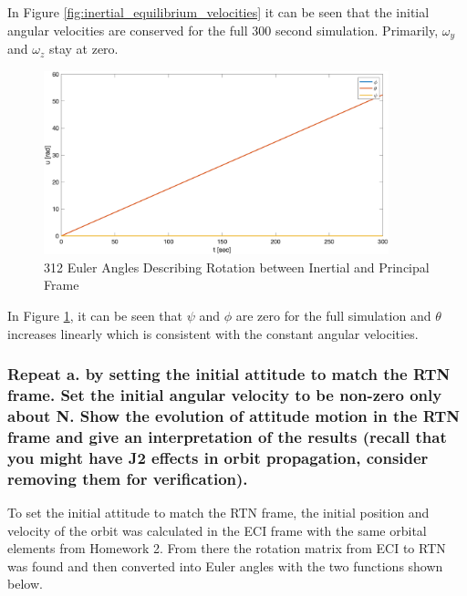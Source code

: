 In Figure \ref{fig:inertial_equilibrium_velocities} it can be seen that the initial angular velocities are conserved for the full 300 second simulation. Primarily, $\omega_y$ and $\omega_z$ stay at zero.

\begin{figure}[H]
    \centering
    \captionsetup{justification = centering}
    \includegraphics[width = 10cm]{Images/PS4/equilibrium_inertial_angles.png}
    \caption{312 Euler Angles Describing Rotation between Inertial and Principal Frame}
    \label{fig:inertial_equilibrium_angles}
\end{figure}

In Figure \ref{fig:inertial_equilibrium_angles}, it can be seen that $\psi$ and $\phi$ are zero for the full simulation and $\theta$ increases linearly which is consistent with the constant angular velocities.

\subsubsection{Repeat a. by setting the initial attitude to match the RTN frame. Set the initial angular velocity to
be non-zero only about N. Show the evolution of attitude motion in the RTN frame and give an
interpretation of the results (recall that you might have J2 effects in orbit propagation, consider
removing them for verification).}

To set the initial attitude to match the RTN frame, the initial position and velocity of the orbit was calculated in the ECI frame with the same orbital elements from Homework 2. From there the rotation matrix from ECI to RTN was found and then converted into Euler angles with the two functions shown below.

